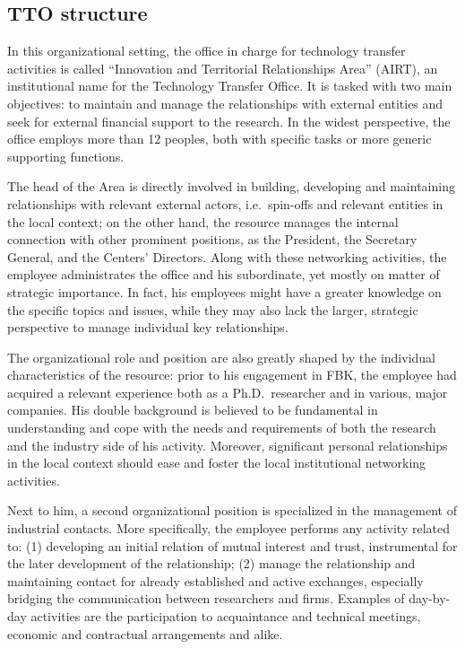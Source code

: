 \subsection{TTO structure}

In this organizational setting, the office in charge for technology transfer activities is called \enquote{Innovation and Territorial Relationships Area} (AIRT), an institutional name for the Technology Transfer Office. It is tasked with two main objectives: to maintain and manage the relationships with external entities and seek for external financial support to the research. In the widest perspective, the office employs more than 12 peoples, both with specific tasks or more generic supporting functions. 

The head of the Area is directly involved in building, developing and maintaining relationships with relevant external actors, i.e.\ spin-offs and relevant entities in the local context; on the other hand, the resource manages the internal connection with other prominent positions, as the President, the Secretary General, and the Centers' Directors. Along with these networking activities, the employee administrates the office and his subordinate, yet mostly on matter of strategic importance. In fact, his employees might have a greater knowledge on the specific topics and issues, while they may also lack the larger, strategic perspective to manage individual key relationships.

The organizational role and position are also greatly shaped by the individual characteristics of the resource: prior to his engagement in FBK, the employee had acquired a relevant experience both as a Ph.D.\ researcher and in various, major companies. His double background is believed to be fundamental in understanding and cope with the needs and requirements of both the research and the industry side of his activity. Moreover, significant personal relationships in the local context should ease and foster the local institutional networking activities.

Next to him, a second organizational position is specialized in the management of industrial contacts. More specifically, the employee performs any activity related to: (1) developing an initial relation of mutual interest and trust, instrumental for the later development of the relationship; (2) manage the relationship and maintaining contact for already established and active exchanges, especially bridging the communication between researchers and firms. Examples of day-by-day activities are the participation to acquaintance and technical meetings, economic and contractual arrangements and alike.

